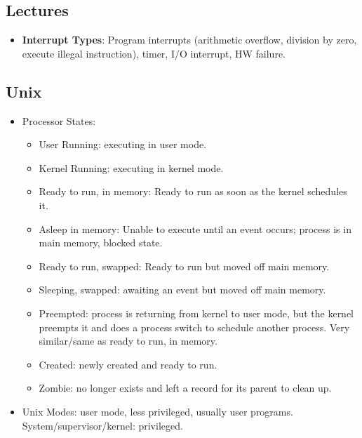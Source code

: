 \documentclass[fontsize=5pt]{scrartcl}
\begin{document}
\begin{multicols}{3}
  \section{Lectures}
      \begin{itemize}
        \item \textbf{Interrupt Types}: Program interrupts (arithmetic overflow, division by zero, execute illegal instruction), timer, I/O interrupt, HW failure.
      \end{itemize}
    \subsection{Unix}
      \begin{itemize}
       \item Processor States:
        \begin{itemize}
         \item User Running: executing in user mode.
         \item Kernel Running: executing in kernel mode.
         \item Ready to run, in memory: Ready to run as soon as the kernel schedules it.
         \item Asleep in memory: Unable to execute until an event occurs; process is in main memory, blocked state.
         \item Ready to run, swapped: Ready to run but moved off main memory.
         \item Sleeping, swapped: awaiting an event but moved off main memory.
         \item Preempted: process is returning from kernel to user mode, but the kernel preempts it and does a process switch
               to schedule another process. Very similar/same as ready to run, in memory.
         \item Created: newly created and ready to run.
         \item Zombie: no longer exists and left a record for its parent to clean up.
        \end{itemize}
        \item Unix Modes: user mode, less privileged, usually user programs. System/supervisor/kernel: privileged.
      \end{itemize}
      

\end{multicols}
\end{document}
